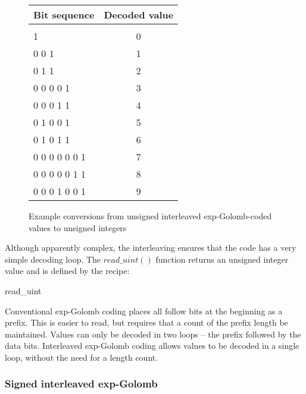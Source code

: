 \begin{figure}[h]
\centering
\begin{tabular}{l|c}
Bit sequence & Decoded value \\
\hline\\
1                 &  0\\
0 0 1             &  1\\
0 1 1             &  2\\
0 0 0 0 1         &  3\\
0 0 0 1 1         &  4\\
0 1 0 0 1         &  5\\
0 1 0 1 1         &  6\\
0 0 0 0 0 0 1     &  7\\
0 0 0 0 0 1 1     &  8\\
0 0 0 1 0 0 1     &  9\\
\end{tabular}

\caption{Example conversions from unsigned interleaved exp-Golomb-coded 
values to unsigned integers \label{uegolcodings}}
\end{figure}

Although apparently complex, the interleaving ensures that the code has a very simple decoding loop. 
The $read\_uint()$ function returns an unsigned integer value and is defined by the recipe:

\begin{pseudo}{read\_uint}{}
  \bsEND
\bsEND
{}

\end{pseudo}


\begin{informative}
Conventional exp-Golomb coding places all follow bits at the beginning as a prefix. This is
easier to read, but requires that a count of the prefix length be maintained. Values can only
be decoded in two loops -- the prefix followed by the data bits. Interleaved exp-Golomb 
coding allows values to be decoded in a single loop, without the need for a length count.
\end{informative}

\subsubsection{Signed interleaved exp-Golomb}
\label{segol}

